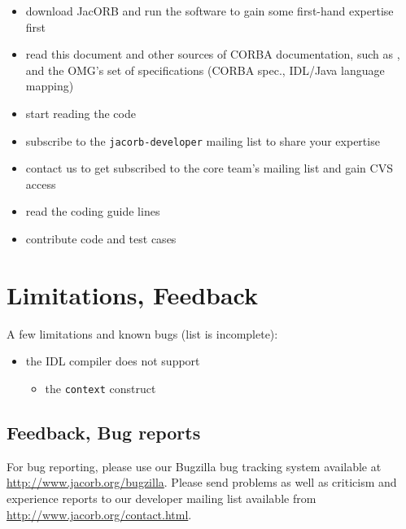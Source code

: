 \begin{itemize}
\item download JacORB and run the software to gain some first-hand
  expertise first
\item read this document and other sources of CORBA documentation,
  such as \cite{Brose2001a}, and the OMG's set of specifications
  (CORBA spec., IDL/Java language mapping)
\item start reading the code
\item subscribe to the {\tt jacorb-developer} mailing list to share
  your expertise
\item contact us to get subscribed to the core team's mailing list and
  gain CVS access
\item read the coding guide lines
\item contribute code and test cases
\end{itemize}

\section{Limitations, Feedback}

A few limitations and known bugs (list is incomplete):

\begin{itemize}
    \item the IDL compiler does not support
    \begin{itemize}
        \item the {\tt context} construct
    \end{itemize}
\end{itemize}

\subsection{Feedback, Bug reports}

For bug reporting, please use our Bugzilla bug tracking system available at
\href{http://www.jacorb.org/bugzilla}{http://www.jacorb.org/bugzilla}.  Please
send problems as well as criticism and experience reports to our developer
mailing list available from
\href{http://www.jacorb.org/contact.html}{http://www.jacorb.org/contact.html}.


